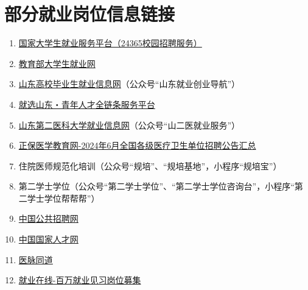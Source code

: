 \section[部分就业岗位信息链接]{部分就业岗位信息链接\footnotemark}
\begin{enumerate}
    \item \href{https://www.ncss.cn}{国家大学生就业服务平台（24365校园招聘服务）}
    \item \href{https://job.ncss.cn}{教育部大学生就业网}
    \item \href{https://www.sdgxbys.cn}{山东高校毕业生就业信息网}（公众号“山东就业创业导航”）
    \item \href{https://www.sdbys.com}{就选山东・青年人才全链条服务平台}
    \item \href{https://wfmc.sdbys.com}{山东第二医科大学就业信息网}（公众号“山二医就业服务”）
    \item \href{https://www.med66.com/weishengdanweizhaopin/gonggao/wa2406033156.shtml}{正保医学教育网-2024年6月全国各级医疗卫生单位招聘公告汇总}
    \item 住院医师规范化培训（公众号“规培”、“规培基地”，小程序“规培宝”）
    \item 第二学士学位（公众号“第二学士学位”、“第二学士学位咨询台”，小程序“第二学士学位帮帮帮”）
    \item \href{http://job.mohrss.gov.cn}{中国公共招聘网}
    \item \href{https://www.newjobs.com.cn}{中国国家人才网}
    \item \href{https://www.yimaitongdao.com}{医脉同道}
    \item \href{https://www.jobonline.cn/probation/index}{就业在线-百万就业见习岗位募集}
\end{enumerate}